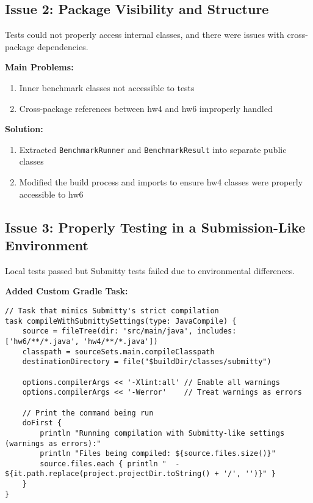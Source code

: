 \documentclass[11pt]{article}
\begin{document}
\subsection*{Issue 2: Package Visibility and Structure}

Tests could not properly access internal classes, and there were issues with cross-package dependencies.

\textbf{Main Problems:}
\begin{enumerate}
    \item Inner benchmark classes not accessible to tests
    \item Cross-package references between hw4 and hw6 improperly handled
\end{enumerate}

\textbf{Solution:}
\begin{enumerate}
    \item Extracted \texttt{BenchmarkRunner} and \texttt{BenchmarkResult} into separate public classes
    \item Modified the build process and imports to ensure hw4 classes were properly accessible to hw6
\end{enumerate}

\subsection*{Issue 3: Properly Testing in a Submission-Like Environment}

Local tests passed but Submitty tests failed due to environmental differences.

\textbf{Added Custom Gradle Task:}
\begin{lstlisting}
// Task that mimics Submitty's strict compilation
task compileWithSubmittySettings(type: JavaCompile) {
    source = fileTree(dir: 'src/main/java', includes: ['hw6/**/*.java', 'hw4/**/*.java'])
    classpath = sourceSets.main.compileClasspath
    destinationDirectory = file("$buildDir/classes/submitty")
    
    options.compilerArgs << '-Xlint:all' // Enable all warnings
    options.compilerArgs << '-Werror'    // Treat warnings as errors
    
    // Print the command being run
    doFirst {
        println "Running compilation with Submitty-like settings (warnings as errors):"
        println "Files being compiled: ${source.files.size()}"
        source.files.each { println "  - ${it.path.replace(project.projectDir.toString() + '/', '')}" }
    }
}
\end{lstlisting}
\end{document}
